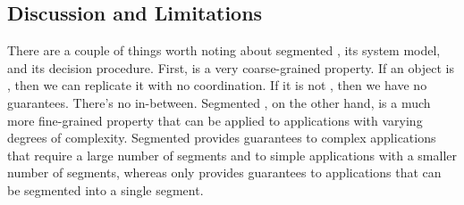 \subsection{Discussion and Limitations}
There are a couple of things worth noting about segmented
\invariantconfluence{}, its system model, and its decision procedure.
%
First, \invariantconfluence{} is a very coarse-grained property. If an object
is \invariantconfluent{}, then we can replicate it with no coordination. If it
is not \invariantconfluent{}, then we have no guarantees. There's no
in-between.  Segmented \invariantconfluence{}, on the other hand, is a much
more fine-grained property that can be applied to applications with varying
degrees of complexity. Segmented \invariantconfluence{} provides guarantees to
complex applications that require a large number of segments and to simple
applications with a smaller number of segments, whereas \invariantconfluence{}
only provides guarantees to applications that can be segmented into a single
segment.



